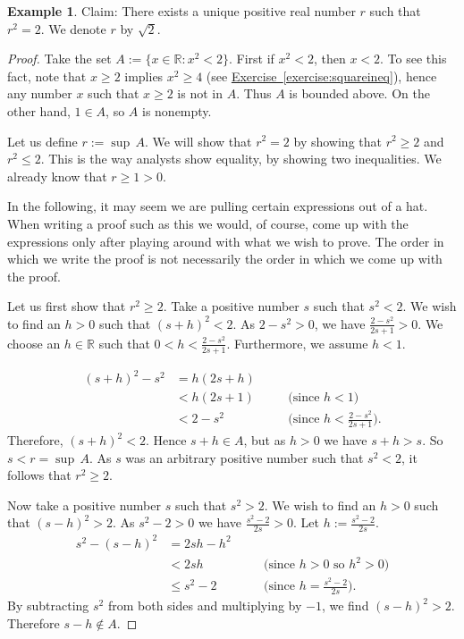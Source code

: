 \documentclass[12pt]{book}
\newcommand{\R}{{\mathbb{R}}}
\theoremstyle{plain}
\theoremstyle{remark}
\theoremstyle{definition}
\theoremstyle{exercise}
\theoremstyle{example}
\newtheorem{example}[thm]{Example}
\newcommand{\exerciseref}[1]{\hyperref[#1]{Exercise~\ref*{#1}}}
\begin{document}
\begin{example} \label{example:sqrt2}
Claim: There exists a unique positive
real number $r$ such that $r^2 = 2$.  We denote $r$ by $\sqrt{2}$.

\begin{proof}
Take the set
$A := \{ x \in \R : x^2 < 2 \}$.  First if $x^2 < 2$,
then $x < 2$.  To see this fact, note that $x \geq 2$ implies $x^2 \geq 4$
(see \exerciseref{exercise:squareineq}),
hence any number $x$ such that $x \geq 2$
is not in $A$.  Thus $A$ is bounded above.
On the other hand, $1 \in A$, so $A$ is nonempty.

Let us define $r := \sup\, A$.  We will show that $r^2 = 2$ by showing
that $r^2 \geq 2$ and $r^2 \leq 2$.  This is the way analysts show
equality, by showing two inequalities.
We already know that $r \geq 1 > 0$.

In the following, it may seem we are pulling certain expressions out of
a hat.  When writing a proof such as this we would, of course, come up with
the expressions only after playing around with what we wish to prove.  The
order in which we write the proof is not necessarily the order in which we
come up with the proof.

Let us first show that $r^2 \geq 2$.
Take a positive number $s$ such that $s^2 < 2$.  We wish to find an $h > 0$
such that ${(s+h)}^2 < 2$.
As $2-s^2 > 0$, we have $\frac{2-s^2}{2s+1} > 0$.
We choose an $h \in \R$ such that
$0 < h < \frac{2-s^2}{2s+1}$.
Furthermore, we assume $h < 1$.

\begin{equation*}
\begin{aligned}
{(s+h)}^2 - s^2 & = h(2s + h) \\
 & < h(2s+1) & & \quad \bigl(\text{since } h < 1\bigr) \\
 & < 2-s^2 & & \quad \bigl(\text{since } h < \tfrac{2-s^2}{2s+1} \bigr) .
\end{aligned}
\end{equation*}
Therefore, ${(s+h)}^2 < 2$.  Hence $s+h \in A$, but as $h > 0$
we have $s+h > s$.  So $s < r = \sup\, A$.  As $s$ was an arbitrary
positive number such that $s^2 < 2$, it follows that $r^2 \geq 2$.


Now take a positive number $s$ such that
$s^2 > 2$.  We wish to find an $h > 0$ such that
${(s-h)}^2 > 2$.
As 
$s^2-2 > 0$ we have $\frac{s^2-2}{2s} > 0$.
Let $h := \frac{s^2-2}{2s}$.
\begin{equation*}
\begin{aligned}
s^2 - {(s-h)}^2 & = 2sh - h^2 \\
 & < 2sh & & \quad \bigl( \text{since $h > 0$ so $h^2 > 0$} \bigr)  \\
 & \leq s^2-2 & & \quad \bigl( \text{since } h = \tfrac{s^2-2}{2s} \bigr) .
\end{aligned}
\end{equation*}
By subtracting $s^2$ from both sides and multiplying by $-1$, we find
${(s-h)}^2 > 2$.  Therefore $s-h \notin A$.


\end{proof}
\end{example}
\end{document}
